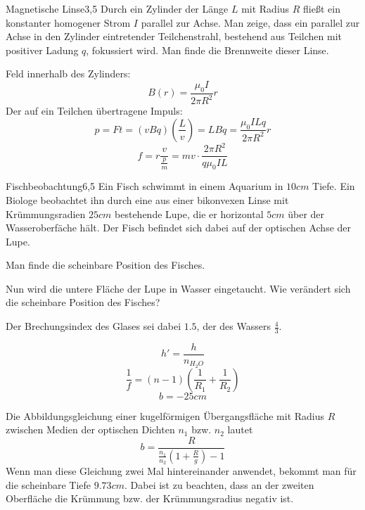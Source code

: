 


\begin{problem}{Magnetische Linse}{3,5}
Durch ein Zylinder der Länge $L$ mit Radius $R$ fließt ein konstanter homogener Strom $I$ parallel zur Achse. Man zeige, dass ein parallel zur Achse in den Zylinder eintretender Teilchenstrahl, bestehend aus Teilchen mit positiver Ladung $q$, fokussiert wird. Man finde die Brennweite dieser Linse.
\begin{solution}
Feld innerhalb des Zylinders:
\[
B(r)=\frac{\mu_0 I}{2 \pi R^2}r
\]
Der auf ein Teilchen übertragene Impuls:
\[
p=Ft=(vBq)(\frac Lv)=LBq=\frac{\mu_0 I L q}{2 \pi R^2}r
\]
\[
f=r\frac{v}{\frac pm}=mv \cdot \frac{2 \pi R^2}{q \mu_0 I L}
\]
\end{solution}
\end{problem}

\begin{problem}{Fischbeobachtung}{6,5}
Ein Fisch schwimmt in einem Aquarium in $10 \unit{cm}$ Tiefe. Ein Biologe beobachtet ihn durch eine aus einer bikonvexen Linse mit Krümmungsradien $25 \unit{cm}$ bestehende Lupe, die er horizontal $5 \unit{cm}$ über der Wasseroberfäche hält. Der Fisch befindet sich dabei auf der optischen Achse der Lupe.
\begin{abcenum}
\item Man finde die scheinbare Position des Fisches.
\item Nun wird die untere Fläche der Lupe in Wasser eingetaucht. Wie verändert sich die scheinbare Position des Fisches?
\end{abcenum}
Der Brechungsindex des Glases sei dabei $1.5$, der des Wassers $\frac43$.
\begin{solution}
\begin{abcenum}
\item
\[
h'=\frac{h}{n_{H_2O}}
\]
\[
\frac 1f = (n-1)\left( \frac 1{R_1}+\frac 1{R_2} \right)
\]
\[
b=-25 \unit{cm}
\]
\item
Die Abbildungsgleichung einer kugelförmigen Übergangsfläche mit Radius $R$ zwischen Medien der optischen Dichten $n_1$ bzw. $n_2$ lautet
\[
b = \frac{R}{\frac{n_1}{n_2} \left( 1+\frac R g \right) -1}
\]
Wenn man diese Gleichung zwei Mal hintereinander anwendet, bekommt man für die scheinbare Tiefe $9.73 \unit{cm}$. Dabei ist zu beachten, dass an der zweiten Oberfläche die Krümmung bzw. der Krümmungsradius negativ ist.
\end{abcenum}
\end{solution}
\end{problem}

